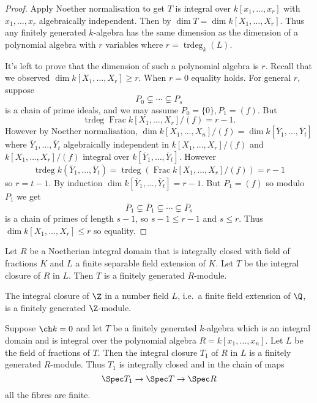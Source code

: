 \documentclass[a4paper]{article}
\DeclareMathOperator{\trdeg}{trdeg} %
\DeclareMathOperator{\Frac}{Frac}
\begin{document}
\begin{proof}
  Apply Noether normalisation to get \(T\) is integral over \(k[x_1, \dots, x_r]\) with \(x_1, \dots, x_r\) algebraically independent. Then by  \(\dim T = \dim k[X_1, \dots, X_r]\). Thus any finitely generated \(k\)-algebra has the same dimension as the dimension of a polynomial algebra with \(r\) variables where \(r = \trdeg_k(L)\).

  It's left to prove that the dimension of such a polynomial algebra is \(r\). Recall that we observed \(\dim k[X_1, \dots, X_r] \geq r\). When \(r = 0\) equality holds. For general \(r\), suppose
  \[
    P_0 \subsetneq \cdots \subsetneq P_s
  \]
  is a chain of prime ideals, and we may assume \(P_0 = \{0\}, P_1 = (f)\). But
  \[
    \trdeg \Frac k[X_1, \dots, X_r]/(f) = r - 1.
  \]
  However by Noether normalisation, \(\dim k[X_1, \dots, X_n]/(f) = \dim k[\overline Y_1, \dots, \overline Y_t]\) where \(\overline Y_1, \dots, \overline Y_t\) algebraically independent in \(k[X_1, \dots, X_r]/(f)\) and \(k[X_1, \dots, X_r]/(f)\) integral over \(k[\overline Y_1, \dots, \overline Y_t]\). However
  \[
    \trdeg k(\overline Y_1, \dots, \overline Y_t) = \trdeg (\Frac k[X_1, \dots, X_r]/(f)) = r- 1
  \]
  so \(r = t - 1\). By induction \(\dim k[\overline Y_1, \dots, \overline Y_t] = r - 1\). But \(P_1 = (f)\) so modulo \(P_1\) we get
  \[
    \overline P_1 \subsetneq \overline P_1 \subsetneq \cdots \subsetneq \overline P_s
  \]
  is a chain of primes of length \(s - 1\), so \(s - 1 \leq r - 1\) and \(s \leq r\). Thus \(\dim k[X_1, \dots, X_r] \leq r\) so equality.
\end{proof}

\begin{theorem}
  \label{thm:integral closure of Noetherian integral domain}
  Let \(R\) be a Noetherian integral domain that is integrally closed with field of fractions \(K\) and \(L\) a finite separable field extension of \(K\). Let \(T\) be the integral closure of \(R\) in \(L\). Then \(T\) is a finitely generated \(R\)-module.
\end{theorem}

\begin{corollary}
  The integral closure of \(\Z\) in a number field \(L\), i.e.\ a finite field extension of \(\Q\), is a finitely generated \(\Z\)-module.
\end{corollary}

\begin{corollary}
  Suppose \(\ch k = 0\) and let \(T\) be a finitely generated \(k\)-algebra which is an integral domain and is integral over the polynomial algebra \(R = k[x_1, \dots, x_n]\). Let \(L\) be the field of fractions of \(T\). Then the integral closure \(T_1\) of \(R\) in \(L\) is a finitely generated \(R\)-module. Thus \(T_1\) is integrally closed and in the chain of maps
  \[
    \Spec T_1 \to \Spec T \to \Spec R
  \]
  all the fibres are finite.
\end{corollary}
\end{document}

